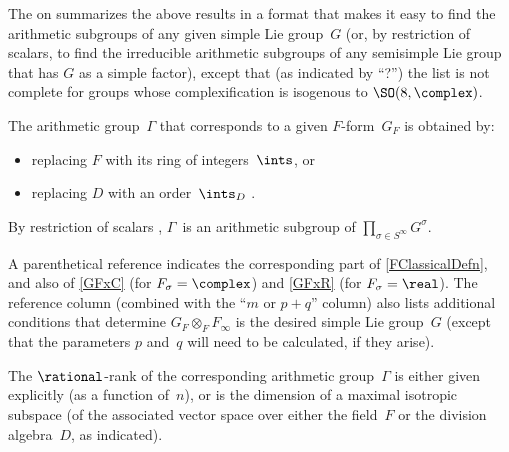 \begin{rem} \label{IrredInGRem}
The  %
 on  summarizes the above results in a format that makes it easy to find the arithmetic subgroups of any given simple Lie group~$G$ (or, by restriction of scalars, to find the irreducible arithmetic subgroups of any semisimple Lie group that has $G$ as a simple factor), except
that (as indicated by ``?'') the list is not complete for groups whose complexification is isogenous to $\SO(8,\complex)$.

The arithmetic group~$\Gamma$ that corresponds to a given $F$-form~$G_F$ is obtained by:
	\begin{itemize}
	\item replacing $F$ with its ring of integers~$\ints$,
	or
	\item replacing $D$ with an order~$\ints_D$ .
	\end{itemize}
By restriction of scalars , $\Gamma$~is an arithmetic subgroup of $\prod_{\sigma \in S^\infty} G^\sigma$.

A parenthetical reference indicates the corresponding part of \cref{FClassicalDefn}, and also of  \cref{GFxC} (for $F_\sigma = \complex$) and \cref{GFxR} (for $F_\sigma = \real$).
The reference column (combined with the ``$m$ or $p + q$'' column) also lists additional conditions that determine $G_F \otimes_F F_\infty$ is the desired simple Lie group~$G$ (except that the parameters $p$ and~$q$ will need to be calculated, if they arise).

The $\rational$-rank of the corresponding arithmetic group~$\Gamma$ is either given explicitly (as a function of~$n$), or  is the dimension of a maximal isotropic subspace (of the associated vector space over either the field~$F$ or the division algebra~$D$, as indicated).
\end{rem}

